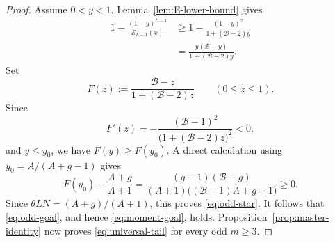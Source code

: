 \documentclass[10pt,a4paper]{amsart}
\newcommand{\Bc}{\mathcal{B}}
\begin{document}
\begin{proof}
Assume \(0<y<1\).  Lemma~\ref{lem:E-lower-bound} gives
\[
\begin{aligned}
 1-\frac{(1-y)^{L-1}}{\mathcal E_{L-1}(x)}
 &\ge
 1-\frac{(1-y)^2}{1+(\Bc-2)y}\\
 &=\frac{y(\Bc-y)}{1+(\Bc-2)y}.
\end{aligned}
\]
Set
\[
 F(z):=\frac{\Bc-z}{1+(\Bc-2)z}
 \qquad(0\le z\le1).
\]
Since
\[
 F'(z)=-
 \frac{(\Bc-1)^2}
 {\bigl(1+(\Bc-2)z\bigr)^2}<0,
\]
and \(y\le y_0\), we have \(F(y)\ge F(y_0)\).  A direct calculation
using \(y_0=A/(A+g-1)\) gives
\[
 F(y_0)-\frac{A+g}{A+1}
 =
 \frac{(g-1)(\Bc-g)}
 {(A+1)\bigl((\Bc-1)A+g-1\bigr)}
 \ge0.
\]
Since \(\theta LN=(A+g)/(A+1)\), this proves
\eqref{eq:odd-star}.  It follows that \eqref{eq:odd-goal}, and hence
\eqref{eq:moment-goal}, holds.  Proposition~\ref{prop:master-identity}
now proves \eqref{eq:universal-tail} for every odd \(m\ge3\).
\end{proof}
\end{document}

